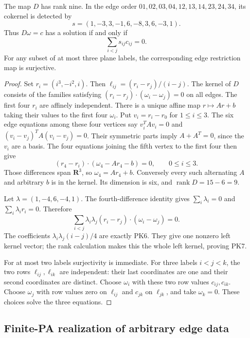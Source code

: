 \begin{lemma}
\label{lem:r13-five-plane-edge-stress}
The map \(D\) has rank nine.  In the edge order
\(01,02,03,04,12,13,14,23,24,34\), its cokernel is detected by
\[
 s=(1,-3,3,-1,6,-8,3,6,-3,1).
 \tag{PK6}
\]
Thus \(D\omega=c\) has a solution if and only if
\[
                    \sum_{i<j}s_{ij}c_{ij}=0.
 \tag{PK7}
\]
For any subset of at most three plane labels, the corresponding
edge restriction map is surjective.
\end{lemma}

\begin{proof}
Set \(r_i=(i^3,-i^2,i)\).  Then
\(\ell_{ij}=(r_i-r_j)/(i-j)\).  The kernel of \(D\) consists
of the families satisfying
\((r_i-r_j)\cdot(\omega_i-\omega_j)=0\) on all edges.
The first four \(r_i\) are affinely independent.  There is a
unique affine map \(r\mapsto Ar+b\) taking their values to
the first four \(\omega_i\).  Put \(v_i=r_i-r_0\) for
\(1\leq i\leq3\).  The six edge equations among these four
vertices say
\(v_i^TAv_i=0\) and
\((v_i-v_j)^TA(v_i-v_j)=0\).  Their symmetric parts imply
\(A+A^T=0\), since the \(v_i\) are a basis.  The four equations
joining the fifth vertex to the first four then give
\[
       (r_4-r_i)\cdot(\omega_4-Ar_4-b)=0,
                          \qquad 0\leq i\leq3.
\]
Those differences span \(\mathbf R^3\), so
\(\omega_4=Ar_4+b\).  Conversely every such alternating
\(A\) and arbitrary \(b\) is in the kernel.  Its dimension
is six, and \(\operatorname{rank}D=15-6=9\).

Let \(\lambda=(1,-4,6,-4,1)\).  The fourth-difference identity
gives \(\sum_i\lambda_i=0\) and
\(\sum_i\lambda_i r_i=0\).  Therefore
\[
 \sum_{i<j}\lambda_i\lambda_j
       (r_i-r_j)\cdot(\omega_i-\omega_j)=0.
\]
The coefficients
\(\lambda_i\lambda_j(i-j)/4\) are exactly PK6.  They give
one nonzero left kernel vector; the rank calculation makes
this the whole left kernel, proving PK7.

For at most two labels surjectivity is immediate.  For three
labels \(i<j<k\), the two rows \(\ell_{ij},\ell_{ik}\)
are independent: their last coordinates are one and their
second coordinates are distinct.  Choose \(\omega_i\) with
these two row values \(c_{ij},c_{ik}\).  Choose
\(\omega_j\) with row values zero on \(\ell_{ij}\) and
\(c_{jk}\) on \(\ell_{jk}\), and take \(\omega_k=0\).
These choices solve the three equations.
\end{proof}

\subsection{Finite-PA realization of arbitrary edge data}

